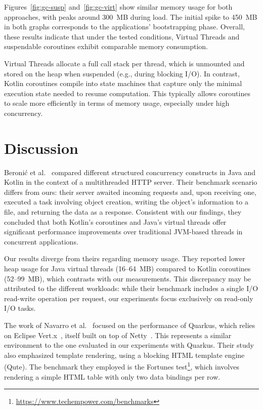 Figures~\ref{fig:gc-susp} and~\ref{fig:gc-virt} show similar memory usage for
both approaches, with peaks around 300~MB during load. The initial spike to
450~MB in both graphs corresponds to the applications' bootstrapping phase.
Overall, these results indicate that under the tested conditions, Virtual
Threads and suspendable coroutines exhibit comparable memory consumption.

Virtual Threads allocate a full call stack per thread, which is unmounted and
stored on the heap when suspended (e.g., during blocking I/O). In contrast,
Kotlin coroutines compile into state machines that capture only the minimal
execution state needed to resume computation. This typically allows coroutines
to scale more efficiently in terms of memory usage, especially under high
concurrency.

\section{Discussion}

Beronić et al.~\cite{9803765} compared different structured concurrency
constructs in Java and Kotlin in the context of a multithreaded HTTP server.
Their benchmark scenario differs from ours: their server awaited incoming
requests and, upon receiving one, executed a task involving object creation,
writing the object's information to a file, and returning the data as a
response. Consistent with our findings, they concluded that both Kotlin's
coroutines and Java's virtual threads offer significant performance
improvements over traditional JVM-based threads in concurrent applications.

Our results diverge from theirs regarding memory usage. They reported lower
heap usage for Java virtual threads (16–64~MB) compared to Kotlin coroutines
(52–99~MB), which contrasts with our measurements. This discrepancy may be
attributed to the different workloads: while their benchmark includes a single
I/O read-write operation per request, our experiments focus exclusively on
read-only I/O tasks.

The work of Navarro et al.~\cite{navarro2023considerations} focused on the
performance of Quarkus, which relies on Eclipse Vert.x~\cite{vertx}, itself
built on top of Netty~\cite{netty}. This represents a similar environment to
the one evaluated in our experiments with Quarkus. Their study also emphasized
template rendering, using a blocking HTML template engine (Qute). The benchmark
they employed is the Fortunes
test\footnote{\url{https://www.techempower.com/benchmarks}}, which involves
rendering a simple HTML table with only two data bindings per row.


